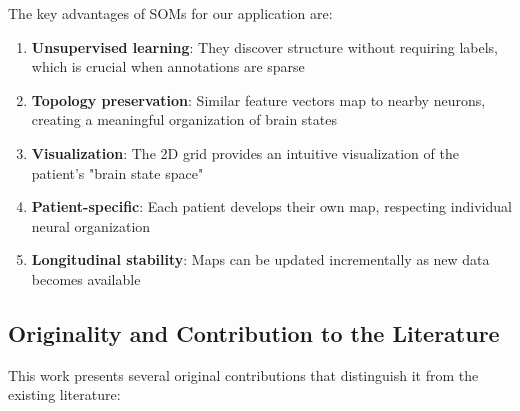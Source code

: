 The key advantages of SOMs for our application are:
\begin{enumerate}
    \item \textbf{Unsupervised learning}: They discover structure without requiring labels, which is crucial when annotations are sparse
    \item \textbf{Topology preservation}: Similar feature vectors map to nearby neurons, creating a meaningful organization of brain states
    \item \textbf{Visualization}: The 2D grid provides an intuitive visualization of the patient's "brain state space"
    \item \textbf{Patient-specific}: Each patient develops their own map, respecting individual neural organization
    \item \textbf{Longitudinal stability}: Maps can be updated incrementally as new data becomes available
\end{enumerate}

\subsection{Originality and Contribution to the Literature}

This work presents several original contributions that distinguish it from the existing literature:

